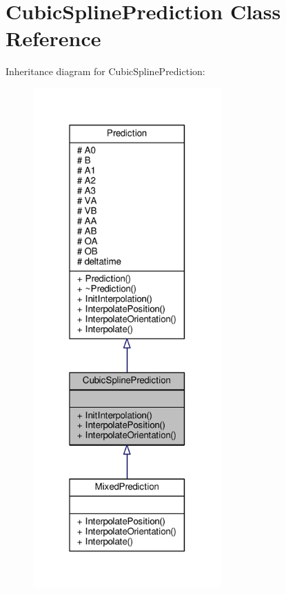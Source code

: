 \hypertarget{classCubicSplinePrediction}{}\section{Cubic\+Spline\+Prediction Class Reference}
\label{classCubicSplinePrediction}


Inheritance diagram for Cubic\+Spline\+Prediction\+:
\nopagebreak
\begin{figure}[H]
\begin{center}
\leavevmode
\includegraphics[width=205pt]{da/dfe/classCubicSplinePrediction__inherit__graph}
\end{center}
\end{figure}


